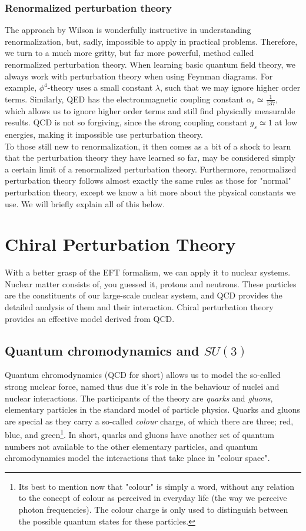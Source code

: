 \documentclass[10pt]{report}
\begin{document}
	\subsection{Renormalized perturbation theory}
	The approach by Wilson is wonderfully instructive in understanding renormalization, but, sadly, impossible to apply in practical problems. Therefore, we turn to a much more gritty, but far more powerful, method called renormalized perturbation theory. When learning basic quantum field theory, we always work with perturbation theory when using Feynman diagrams. For example, $\phi^4$-theory uses a small constant $\lambda$, such that we may ignore higher order terms. Similarly, QED has the electronmagnetic coupling constant $\alpha_e \simeq \frac{1}{137}$, which allows us to ignore higher order terms and still find physically measurable results. QCD is not so forgiving, since the strong coupling constant $g_s \simeq 1$ at low energies, making it impossible use perturbation theory.\\
	
	To those still new to renormalization, it then comes as a bit of a shock to learn that the perturbation theory they have learned so far, may be considered simply a certain limit of a renormalized perturbation theory. Furthermore, renormalized perturbation theory follows almost exactly the same rules as those for "normal" perturbation theory, except we know a bit more about the physical constants we use. We will briefly explain all of this below.
	
	\newpage
	\chapter{Chiral Perturbation Theory}
	With a better grasp of the EFT formalism, we can apply it to nuclear systems. Nuclear matter consists of, you guessed it, protons and neutrons. These particles are the constituents of our large-scale nuclear system, and QCD provides the detailed analysis of them and their interaction. Chiral perturbation theory provides an effective model derived from QCD.
	
	\section{Quantum chromodynamics and $SU(3)$}
	Quantum chromodynamics (QCD for short) allows us to model the so-called strong nuclear force, named thus due it's role in the behaviour of nuclei and nuclear interactions. The participants of the theory are \emph{quarks} and \emph{gluons}, elementary particles in the standard model of particle physics. Quarks and gluons are special as they carry a so-called \emph{colour} charge, of which there are three; red, blue, and green\footnote{Its best to mention now that "colour" is simply a word, without any relation to the concept of colour as perceived in everyday life (the way we perceive photon frequencies). The colour charge is only used to distinguish between the possible quantum states for these particles.}. In short, quarks and gluons have another set of quantum numbers not available to the other elementary particles, and quantum chromodynamics model the interactions that take place in "colour space".
	
\end{document}
